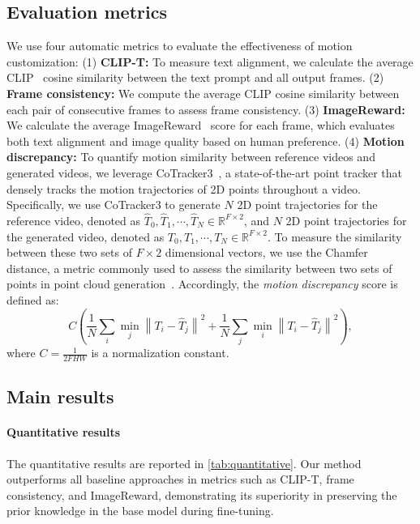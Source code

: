 



\subsection{Evaluation metrics}
\label{sec:metrics}

We use four automatic metrics to evaluate the effectiveness of motion customization:
(1) {\bf CLIP-T:} To measure text alignment, we calculate the average CLIP~\cite{clip} cosine similarity between the text prompt and all output frames.
(2) {\bf Frame consistency:} We compute the average CLIP cosine similarity between each pair of consecutive frames to assess frame consistency.
(3) {\bf ImageReward:} We calculate the average ImageReward~\cite{ir} score for each frame, which evaluates both text alignment and image quality based on human preference.
(4) {\bf Motion discrepancy:} To quantify motion similarity between reference videos and generated videos, we leverage CoTracker3~\cite{cotracker3}, a state-of-the-art point tracker that densely tracks the motion trajectories of 2D points throughout a video. Specifically, we use CoTracker3 to generate $N$ 2D point trajectories for the reference video, denoted as $\hat{T}_0, \hat{T}_1,\cdots,\hat{T}_N\in \mathbb{R}^{F\times 2}$, and $N$ 2D point trajectories for the generated video, denoted as $T_0, T_1,\cdots,T_N\in \mathbb{R}^{F\times 2}$. To measure the similarity between these two sets of $F\times 2$ dimensional vectors, we use the Chamfer distance, a metric commonly used to assess the similarity between two sets of points in point cloud generation~\cite{pcg1,pcg2, pcg3, pcg4}. Accordingly, the {\it motion discrepancy} score is defined as:
\begin{equation}
C\left(\frac 1 N \sum_{i} \min_j \left\|T_i-\hat{T}_j\right\|^2 + \frac 1 N \sum_{j} \min_i \left\|T_i-\hat{T}_j\right\|^2\right)
\label{eq:motion_alignment},
\end{equation}
where $C=\frac 1 {2FHW}$ is a normalization constant.

\subsection{Main results}
\label{sec:quantitative}

\paragraph{Quantitative results}
The quantitative results are reported in \cref{tab:quantitative}. Our method outperforms all baseline approaches in metrics such as CLIP-T, frame consistency, and ImageReward, demonstrating its superiority in preserving the prior knowledge in the base model during fine-tuning.

